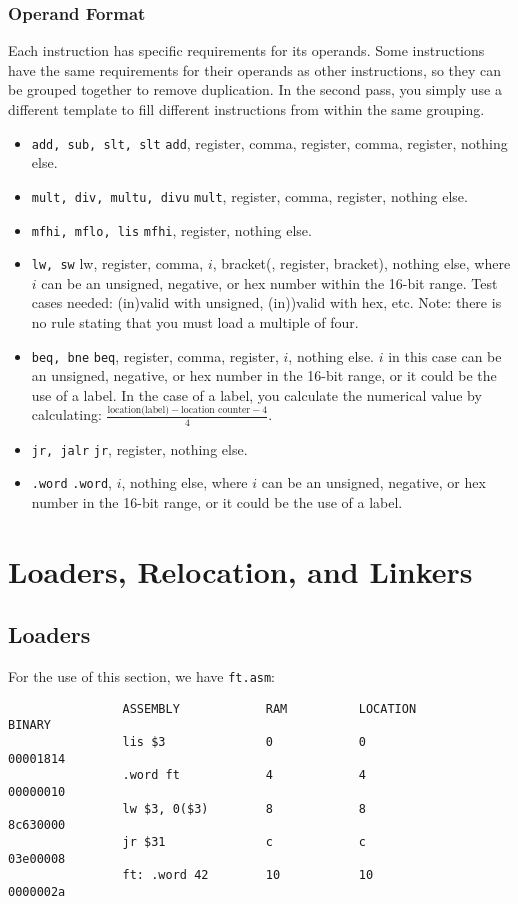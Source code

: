 \documentclass[]{article}
\theoremstyle{definition}
\newcommand{\lecture}[1]{\marginpar{{\footnotesize $\leftarrow$ \underline{#1}}}}
\begin{document}
			\subsubsection{Operand Format}
				Each instruction has specific requirements for its operands. Some instructions have the same requirements for their operands as other instructions, so they can be grouped together to remove duplication. In the second pass, you simply use a different template to fill different instructions from within the same grouping.
				\begin{itemize}
					\item \verb+add, sub, slt, slt+ \textendash{} \verb+add+, register, comma, register, comma, register, nothing else.
					\item \verb+mult, div, multu, divu+ \textendash{} \verb+mult+, register, comma, register, nothing else.
					\item \verb+mfhi, mflo, lis+ \textendash{} \verb+mfhi+, register, nothing else.
					\item \verb+lw, sw+ \textendash{} lw, register, comma, $i$, bracket(, register, bracket), nothing else, where $i$ can be an unsigned, negative, or hex number within the 16-bit range. Test cases needed: (in)valid with unsigned, (in))valid with hex, etc. Note: there is no rule stating that you must load a multiple of four.
					\item  \verb+beq, bne+ \textendash{} \verb+beq+, register, comma, register, $i$, nothing else. $i$ in this case can be an unsigned, negative, or hex number in the 16-bit range, or it could be the use of a label. In the case of a label, you calculate the numerical value by calculating: $\frac{\text{location(label)} - \text{location counter} - 4}{4}$.
					\item \verb+jr, jalr+ \textendash{} \verb+jr+, register, nothing else.
					\item \verb+.word+ \textendash{} \verb+.word+, $i$, nothing else, where $i$ can be an unsigned, negative, or hex number in the 16-bit range, or it could be the use of a label. 
				\end{itemize}
	\section{Loaders, Relocation, and Linkers} \lecture{January 28, 2013}
		\subsection{Loaders}
			For the use of this section, we have \verb+ft.asm+:
			\begin{verbatim}
				ASSEMBLY            RAM          LOCATION          BINARY
				lis $3              0            0                 00001814
				.word ft            4            4                 00000010
				lw $3, 0($3)        8            8                 8c630000
				jr $31              c            c                 03e00008
				ft: .word 42        10           10                0000002a
			\end{verbatim}
\end{document}
